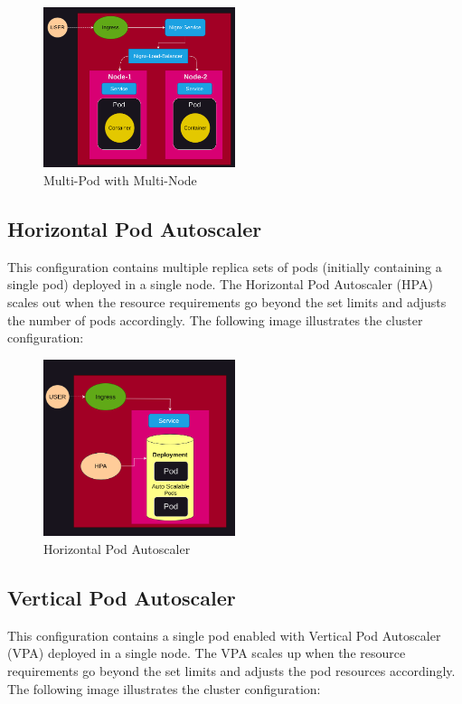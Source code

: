 \documentclass{article}
\begin{document}
\begin{figure}[H]
   \centering
   \includegraphics[width=0.5\textwidth]{../images/two_node.png}
   \caption{Multi-Pod with Multi-Node}
\end{figure}

\subsection{Horizontal Pod Autoscaler}
This configuration contains multiple replica sets of pods (initially containing a single pod) deployed in a single node. The Horizontal Pod Autoscaler (HPA) scales out when the resource requirements go beyond the set limits and adjusts the number of pods accordingly. The following image illustrates the cluster configuration:

\begin{figure}[H]
   \centering
   \includegraphics[width=0.5\textwidth]{../images/hpa.png}
   \caption{Horizontal Pod Autoscaler}
\end{figure}

\subsection{Vertical Pod Autoscaler}
This configuration contains a single pod enabled with Vertical Pod Autoscaler (VPA) deployed in a single node. The VPA scales up when the resource requirements go beyond the set limits and adjusts the pod resources accordingly. The following image illustrates the cluster configuration:
\end{document}
